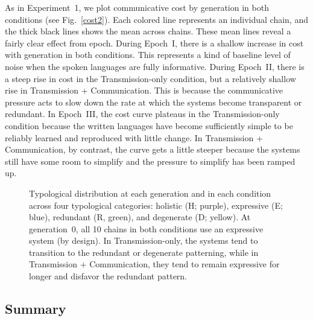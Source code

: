 \documentclass[doc,biblatex]{apa7}
\begin{document}
As in Experiment~1, we plot communicative cost by generation in both conditions (see Fig.~\ref{cost2}). Each colored line represents an individual chain, and the thick black lines shows the mean across chains. These mean lines reveal a fairly clear effect from epoch. During Epoch~I, there is a shallow increase in cost with generation in both conditions. This represents a kind of baseline level of noise when the spoken languages are fully informative. During Epoch~II, there is a steep rise in cost in the Transmission-only condition, but a relatively shallow rise in Transmission + Communication. This is because the communicative pressure acts to slow down the rate at which the systems become transparent or redundant. In Epoch~III, the cost curve plateaus in the Transmission-only condition because the written languages have become sufficiently simple to be reliably learned and reproduced with little change. In Transmission + Communication, by contrast, the curve gets a little steeper because the systems still have some room to simplify and the pressure to simplify has been ramped up.

	\begin{figure}
	\vspace*{2pt}
	\caption{Typological distribution at each generation and in each condition across four typological categories: holistic (H; purple), expressive (E; blue), redundant (R, green), and degenerate (D; yellow). At generation~0, all 10 chains in both conditions use an expressive system (by design). In Transmission-only, the systems tend to transition to the redundant or degenerate patterning, while in Transmission + Communication, they tend to remain expressive for longer and disfavor the redundant pattern.}
	\label{typ_dist_con}
	\end{figure}

\subsection{Summary}
\end{document}
